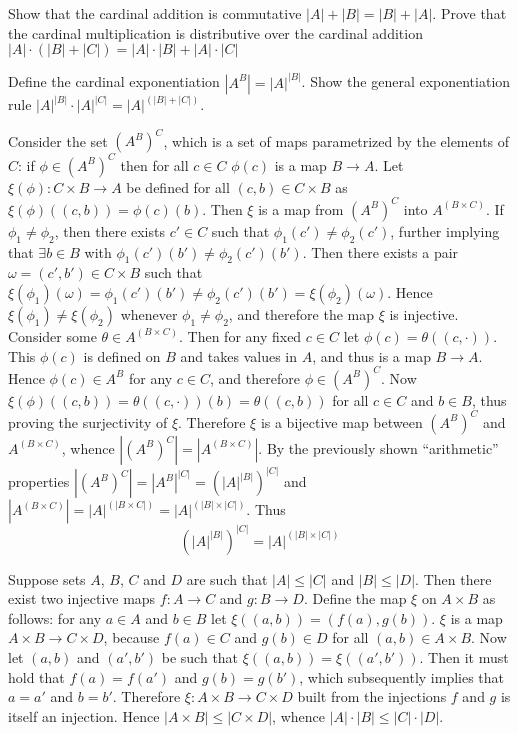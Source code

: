 \documentclass[a4paper]{article}
\newcommand{\brac}[1]{{\left({#1}\right)}}
\begin{document}
Show that the cardinal addition is commutative $|A|+|B| = |B|+|A|$.
Prove that the cardinal multiplication is distributive over the cardinal addition $|A|\cdot \brac{|B|+|C|} = |A|\cdot |B|+|A|\cdot |C|$

Define the cardinal exponentiation $|A^B| = {|A|}^{|B|}$.
Show the general exponentiation rule ${|A|}^{|B|}\cdot {|A|}^{|C|} = {|A|}^\brac{|B|+|C|}$.

Consider the set $\brac{A^B}^C$, which is a set of maps parametrized by the elements of $C$: if $\phi\in \brac{A^B}^C$ then for all $c\in C$ $\phi(c)$ is a map $B\to A$. Let $\xi(\phi):C\times B\to A$ be defined for all $\brac{c, b}\in C\times B$ as $\xi(\phi)(\brac{c,b}) = \phi(c)(b)$. Then $\xi$ is a map from $\brac{A^B}^C$ into $A^\brac{B\times C}$.
If $\phi_1\neq \phi_2$, then there exists $c'\in C$ such that $\phi_1(c')\neq \phi_2(c')$, further implying that $\exists b\in B$ with $\phi_1(c')(b')\neq \phi_2(c')(b')$. Then there exists a pair $\omega = \brac{c',b'}\in C\times B$ such that $\xi(\phi_1)(\omega)=\phi_1(c')(b')\neq \phi_2(c')(b')=\xi(\phi_2)(\omega)$. Hence $\xi(\phi_1)\neq \xi(\phi_2)$ whenever $\phi_1\neq \phi_2$, and therefore the map $\xi$ is injective.
Consider some $\theta\in A^\brac{B\times C}$. Then for any fixed $c\in C$ let $\phi(c) = \theta(\brac{c,\cdot})$. This $\phi(c)$ is defined on $B$ and takes values in $A$, and thus is a map $B\to A$. Hence $\phi(c)\in A^B$ for any $c\in C$, and therefore $\phi\in \brac{A^B}^C$. Now $\xi(\phi)(\brac{c, b}) = \theta(\brac{c,\cdot})(b) = \theta(\brac{c,b})$ for all $c \in C$ and $b\in B$, thus proving the surjectivity of $\xi$. Therefore $\xi$ is a bijective map between $\brac{A^B}^C$ and $A^\brac{B\times C}$, whence $|\brac{A^B}^C| = |A^\brac{B\times C}|$. By the previously shown ``arithmetic'' properties $|\brac{A^B}^C| = {|A^B|}^{|C|} = \brac{{|A|}^{|B|}}^{|C|}$ and $|A^\brac{B\times C}| = {|A|}^\brac{|B\times C|} = {|A|}^\brac{|B|\times |C|}$. Thus \[\brac{{|A|}^{|B|}}^{|C|} = {|A|}^\brac{|B|\times |C|}\]

Suppose sets $A$, $B$, $C$ and $D$ are such that $|A|\leq |C|$ and $|B|\leq |D|$. Then there exist two injective maps $f:A\to C$ and $g:B\to D$. Define the map $\xi$ on $A\times B$ as follows: for any $a\in A$ and $b\in B$ let $\xi(\brac{a,b}) = \brac{f(a), g(b)}$. $\xi$ is a map $A\times B\to C\times D$, because $f(a)\in C$ and $g(b)\in D$ for all $\brac{a,b}\in A\times B$. Now let $\brac{a,b}$ and $\brac{a',b'}$ be such that $\xi(\brac{a,b}) = \xi(\brac{a',b'})$. Then it must hold that $f(a)=f(a')$ and $g(b)=g(b')$, which subsequently implies that $a=a'$ and $b=b'$. Therefore $\xi:A\times B\to C\times D$ built from the injections $f$ and $g$ is itself an injection. Hence $|A\times B|\leq |C\times D|$, whence $|A|\cdot |B|\leq |C|\cdot |D|$.
\end{document}
